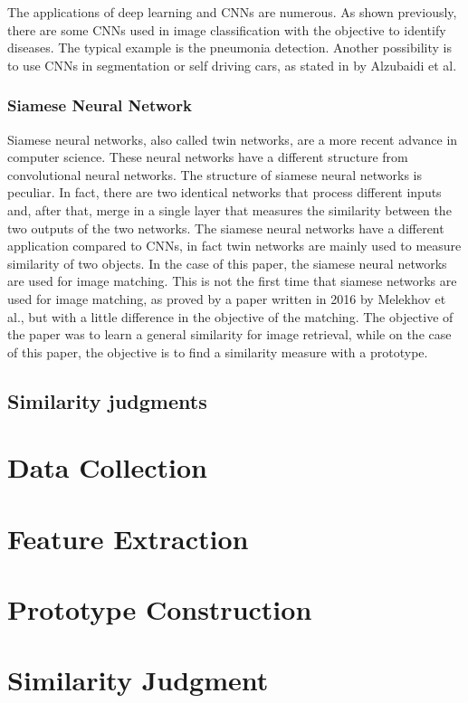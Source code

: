 \documentclass[conference]{IEEEtran}
\begin{document}
				The applications of deep learning and CNNs are numerous. As shown previously, there are some CNNs used in image classification with the objective to identify diseases. The typical example is 
				the pneumonia detection. Another possibility is to use CNNs in segmentation or self driving cars, as stated in \cite{11} by Alzubaidi et al.
		
			\subsubsection{Siamese Neural Network}

				Siamese neural networks, also called twin networks, are a more recent advance in computer science. These neural networks have a different structure from convolutional neural networks. The 
				structure of siamese neural networks is peculiar. In fact, there are two identical networks that process different inputs and, after that, merge in a single layer that measures the similarity between 
				the two outputs of the two networks. The siamese neural networks have a different application compared to CNNs, in fact twin networks are mainly used to measure similarity of two objects. 
				In the case of this paper, the siamese neural networks are used for image matching. This is not the first time that siamese networks are used for image matching, as proved by a paper written in 2016 by 
				Melekhov et al., but with a little difference in the objective of the matching. The objective of the paper was to learn a general similarity for image retrieval, while on the case of this 
				paper, the objective is to find a similarity measure with a prototype. 
		
		\subsection{Similarity judgments}

\section{Data Collection}
\section{Feature Extraction}
\section{Prototype Construction}
\section{Similarity Judgment}
\end{document}
